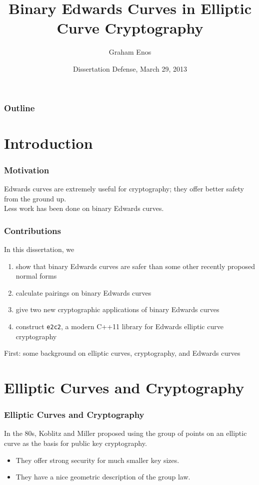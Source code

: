 \documentclass[xcolor=dvipsnames, handout]{beamer}
\title[BECiECC]{Binary Edwards Curves in Elliptic Curve Cryptography}
\author{Graham Enos}
\institute[UNCC Math]{UNC Charlotte Department of Mathematics and Statistics}
\date[Mar 29, 2013]{Dissertation Defense, March 29, 2013}
\begin{document}
\frame{\titlepage}

\begin{frame}
    \frametitle{Outline}
    \tableofcontents[pausesection]
\end{frame}

\section{Introduction}

\begin{frame}
    \frametitle{Motivation}
    Edwards curves are extremely useful for cryptography; they offer better
    safety from the ground up.\\
    Less work has been done on binary Edwards curves.
\end{frame}

\begin{frame}
    \frametitle{Contributions}
    In this dissertation, we
    \begin{enumerate}
        \pause
        \item show that binary Edwards curves are safer than some other
            recently proposed normal forms
        \pause
        \item calculate pairings on binary Edwards curves
        \pause
        \item give two new cryptographic applications of binary Edwards curves
        \pause
        \item construct \texttt{e2c2}, a modern C++11 library for Edwards
            elliptic curve cryptography
    \end{enumerate}
    \pause
    First: some background on elliptic curves, cryptography, and Edwards curves
\end{frame}

\section{Elliptic Curves and Cryptography}

\begin{frame}
    \frametitle{Elliptic Curves and Cryptography}
    In the 80s, Koblitz and Miller proposed using the group of points on an
        elliptic curve as the basis for public key cryptography.
    \begin{itemize}
        \item They offer strong security for much smaller key sizes.
        \item They have a nice geometric description of the group law.
        \end{itemize}   
\end{frame}
\end{document}
